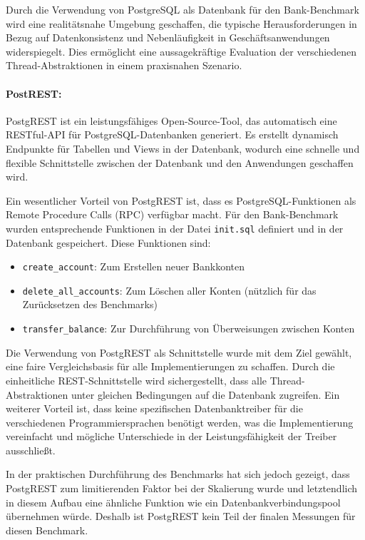 \documentclass[fontsize=12pt,paper=a4,twoside=semi,parskip=half-,headsepline,headinclude]{scrreprt}
\begin{document}
Durch die Verwendung von PostgreSQL als Datenbank für den Bank-Benchmark wird eine realitätsnahe Umgebung geschaffen, die typische Herausforderungen in Bezug auf Datenkonsistenz und Nebenläufigkeit in Geschäftsanwendungen widerspiegelt. Dies er\-mög\-licht eine aussagekräftige Evaluation der verschiedenen Thread-Abstraktionen in einem praxisnahen Szenario.

\paragraph{PostREST:}

PostgREST ist ein leistungsfähiges Open-Source-Tool, das automatisch eine RESTful-API für PostgreSQL-Datenbanken generiert. Es erstellt dynamisch Endpunkte für Tabellen und Views in der Datenbank, wodurch eine schnelle und flexible Schnittstelle zwischen der Datenbank und den Anwendungen geschaffen wird.

Ein wesentlicher Vorteil von PostgREST ist, dass es PostgreSQL-Funktionen als Remote Procedure Calls (RPC) verfügbar macht. Für den Bank-Benchmark wurden entsprechende Funktionen in der Datei \texttt{init.sql} definiert und in der Datenbank gespeichert. Diese Funktionen sind:

\begin{itemize}
	\item \texttt{create\_account}: Zum Erstellen neuer Bankkonten
	\item \texttt{delete\_all\_accounts}: Zum Löschen aller Konten (nützlich für das Zurücksetzen des Benchmarks)
	\item \texttt{transfer\_balance}: Zur Durchführung von Überweisungen zwischen Konten
\end{itemize}

Die Verwendung von PostgREST als Schnittstelle wurde mit dem Ziel gewählt, eine faire Vergleichsbasis für alle Implementierungen zu schaffen. Durch die einheitliche REST-Schnittstelle wird sichergestellt, dass alle Thread-Abstraktionen unter gleichen Bedingungen auf die Datenbank zugreifen. Ein weiterer Vorteil ist, dass keine spezifischen Datenbanktreiber für die verschiedenen Programmiersprachen benötigt werden, was die Implementierung vereinfacht und mögliche Unterschiede in der Leistungsfähigkeit der Treiber ausschließt.

In der praktischen Durchführung des Benchmarks hat sich jedoch gezeigt, dass PostgREST zum limitierenden Faktor bei der Skalierung wurde und letztendlich in diesem Aufbau eine ähnliche Funktion wie ein Datenbankverbindungspool übernehmen würde. Deshalb ist PostgREST kein Teil der finalen Messungen für diesen Benchmark.
\end{document}
